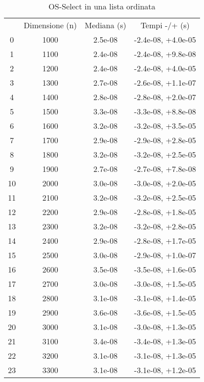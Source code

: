 \begin{table}
\centering
\caption{OS-Select in una lista ordinata}
\label{OS-Select in una lista ordinata}
\begin{adjustbox}{width=1\textwidth/2}
\begin{tabular}{|c|c|c|c|}
\hline
 & Dimensione (n) & Mediana (s) & Tempi -/+ (s) \\
0 & 1000 & 2.5e-08 & -2.4e-08, +4.0e-05 \\
\cline{1-4}
1 & 1100 & 2.4e-08 & -2.4e-08, +9.8e-08 \\
\cline{1-4}
2 & 1200 & 2.4e-08 & -2.4e-08, +4.0e-05 \\
\cline{1-4}
3 & 1300 & 2.7e-08 & -2.6e-08, +1.1e-07 \\
\cline{1-4}
4 & 1400 & 2.8e-08 & -2.8e-08, +2.0e-07 \\
\cline{1-4}
5 & 1500 & 3.3e-08 & -3.3e-08, +8.8e-08 \\
\cline{1-4}
6 & 1600 & 3.2e-08 & -3.2e-08, +3.5e-05 \\
\cline{1-4}
7 & 1700 & 2.9e-08 & -2.9e-08, +2.8e-05 \\
\cline{1-4}
8 & 1800 & 3.2e-08 & -3.2e-08, +2.5e-05 \\
\cline{1-4}
9 & 1900 & 2.7e-08 & -2.7e-08, +7.8e-08 \\
\cline{1-4}
10 & 2000 & 3.0e-08 & -3.0e-08, +2.0e-05 \\
\cline{1-4}
11 & 2100 & 3.2e-08 & -3.2e-08, +2.5e-05 \\
\cline{1-4}
12 & 2200 & 2.9e-08 & -2.8e-08, +1.8e-05 \\
\cline{1-4}
13 & 2300 & 3.2e-08 & -3.2e-08, +2.8e-05 \\
\cline{1-4}
14 & 2400 & 2.9e-08 & -2.8e-08, +1.7e-05 \\
\cline{1-4}
15 & 2500 & 3.0e-08 & -2.9e-08, +1.0e-07 \\
\cline{1-4}
16 & 2600 & 3.5e-08 & -3.5e-08, +1.6e-05 \\
\cline{1-4}
17 & 2700 & 3.0e-08 & -3.0e-08, +1.5e-05 \\
\cline{1-4}
18 & 2800 & 3.1e-08 & -3.1e-08, +1.4e-05 \\
\cline{1-4}
19 & 2900 & 3.6e-08 & -3.6e-08, +1.5e-05 \\
\cline{1-4}
20 & 3000 & 3.1e-08 & -3.0e-08, +1.3e-05 \\
\cline{1-4}
21 & 3100 & 3.4e-08 & -3.4e-08, +1.3e-05 \\
\cline{1-4}
22 & 3200 & 3.1e-08 & -3.1e-08, +1.3e-05 \\
\cline{1-4}
23 & 3300 & 3.1e-08 & -3.1e-08, +1.2e-05 \\

\end{tabular}
\end{adjustbox}
\end{table}

